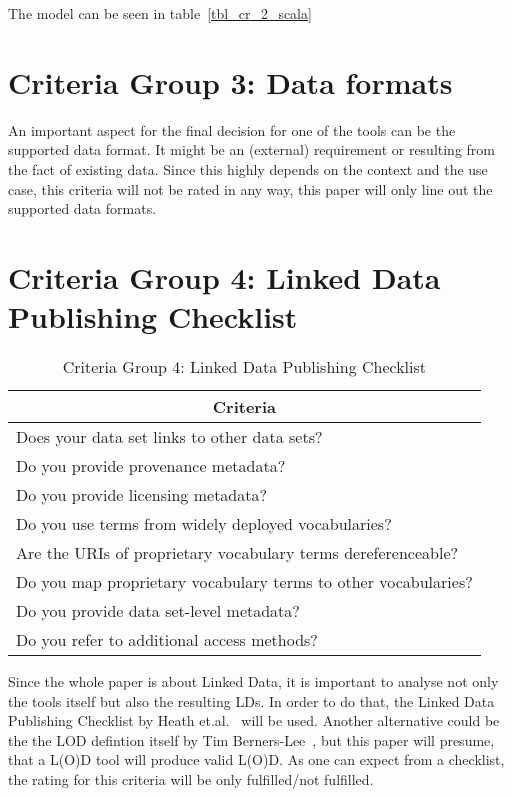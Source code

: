 The model can be seen in table~\ref{tbl_cr_2_scala}

\section{Criteria Group 3: Data formats}

An important aspect for the final decision for one of the tools can be the supported data format. It might be an (external) requirement or resulting from the fact of existing data. Since this highly depends on the context and the use case, this criteria will not be rated in any way, this paper will only line out the supported data formats.

\section{Criteria Group 4: Linked Data Publishing Checklist}

\begin{table}[htb]
\centering
\begin{tabular}{|l|}
\hline
\multicolumn{1}{|c|}{\textbf{Criteria}}                        \\ \hline
Does your data set links to other data sets?                   \\ \hline
Do you provide provenance metadata?                            \\ \hline
Do you provide licensing metadata?                             \\ \hline
Do you use terms from widely deployed vocabularies?            \\ \hline
Are the URIs of proprietary vocabulary terms dereferenceable?  \\ \hline
Do you map proprietary vocabulary terms to other vocabularies? \\ \hline
Do you provide data set-level metadata?                        \\ \hline
Do you refer to additional access methods?                     \\ \hline
\end{tabular}
\caption{Criteria Group 4: Linked Data Publishing Checklist}
\label{tbl_cr_4_scala}
\end{table}

Since the whole paper is about Linked Data, it is important to analyse not only the tools itself but also the resulting LDs. In order to do that, the Linked Data Publishing Checklist by Heath et.al.~\cite{heath2011linked} will be used. Another alternative could be the the LOD defintion itself by Tim Berners-Lee~\cite{berners2006linked}, but this paper will presume, that a L(O)D tool will produce valid L(O)D. As one can expect from a checklist, the rating for this criteria will be only fulfilled/not fulfilled.

